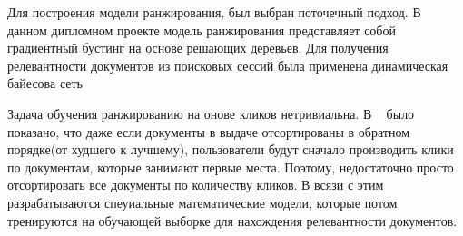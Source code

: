 Для построения модели ранжирования, был выбран поточечный подход. В данном дипломном проекте модель ранжирования представляет собой градиентный бустинг на основе решающих деревьев. Для получения релевантности документов из поисковых сессий была применена динамическая байесова сеть

Задача обучения ранжированию на онове кликов нетривиальна. В ~\cite{joachims} было показано, что даже если документы в выдаче отсортированы в обратном порядке(от худшего к лучшему), пользователи будут сначало производить клики по документам, которые занимают первые места. Поэтому, недостаточно просто отсортировать все документы по количеству кликов. В всязи с этим разрабатываются спеуиальные математические модели, которые потом тренируются на обучающей выборке для нахождения релевантности документов.

\newpage